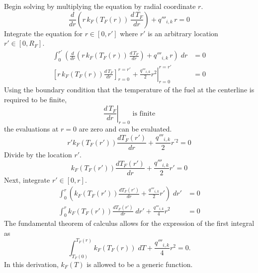       Begin solving  by multiplying the
      equation by radial coordinate $r$.
      \begin{equation}
        \frac{d}{dr} \left( r\, k_F(T_F(r)) \, \frac{d\, T_F}{dr} 
          \right) + q'''_{i,k} \, r = 0
      \end{equation}
      Integrate the equation for $r \in [0,r']$ where $r'$ is an arbitrary
      location $r' \in [0,R_F]$.
      \begin{align}
        \int_0^{r'} \left( \frac{d}{dr} \left( r\, k_F(T_F(r)) \, 
          \frac{d\, T_F}{dr} \right) + q'''_{i,k}\,r \right) \; dr &= 0 \\
        \label{eq:need_bc}
        \left[ r \, k_F(T_F(r)) \frac{d\,T_F}{dr} \right]_{r=0}^{r=r'} + 
          \left. \frac{q'''_{i,k}}{2} r^2 \right|_{r=0}^{r=r'} &= 0 
      \end{align}
      Using the boundary condition that the temperature of the fuel at the 
      centerline is required to be finite,
      \begin{equation}
        \left. \frac{d \, T_F}{dr} \right|_{r=0} \text{ is finite}
      \end{equation}
      the evaluations at $r=0$ are zero and  can be evaluated.
      \begin{equation}
        \label{eq:dtdr_fuel}
        r' k_F(T_F(r')) \frac{dT_F(r')}{dr} + 
          \frac{q'''_{i,k}}{2} r^{\prime 2} = 0
      \end{equation}
      Divide by the location $r'$.
      \begin{equation}
        k_F(T_F(r')) \frac{dT_F(r')}{dr} + 
          \frac{q'''_{i,k}}{2} r' = 0
      \end{equation}
      Next, integrate $r' \in [0,r]$.
      \begin{align}
        \int_0^r \left( k_F(T_F(r')) \frac{dT_F(r')}{dr}
          + \frac{q'''_{i,k}}{2} r' \right) \; dr' &= 0 \\
        \int_0^r k_F(T_F(r')) \frac{dT_F(r')}{dr} \; dr' + 
          \frac{q'''_{i,k}}{4} r^2 &= 0
      \end{align}
      The fundamental theorem of calculus allows for the expression of the first
      integral as
      \begin{equation}
        \label{eq:tcl_integral}
        \int_{T_F(0)}^{T_F(r)} k_F(T_F(r)) \; dT + \frac{q'''_{i,k}}{4} r^2 = 0.
      \end{equation}
      In this derivation, $k_F(T)$ is allowed to be a generic function.
